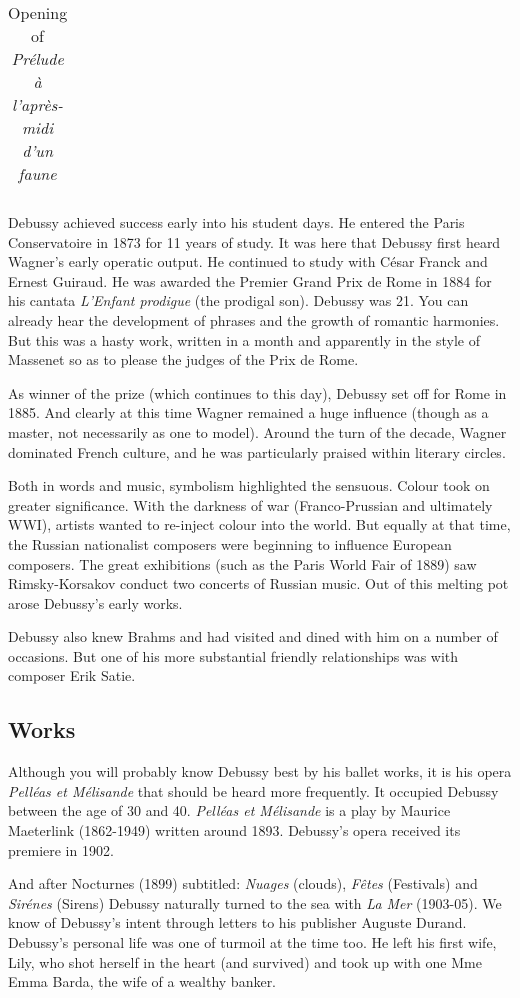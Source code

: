 \begin{table}[h!]
\begin{tabular}{|l|l|}
\hline
\end{tabular}
\caption{Opening of \textit{Pr\'elude \`a l'apr\`es-midi d'un faune}}
\label{tab:faune}
\end{table}

Debussy achieved success early into his student days. He entered the Paris Conservatoire in 1873 for 11 years of study. It was here that Debussy first heard Wagner's early operatic output. He continued to study with C\'esar Franck and Ernest Guiraud. He was awarded the Premier Grand Prix de Rome in 1884 for his cantata \textit{L'Enfant prodigue} (the prodigal son). Debussy was 21. You can already hear the development of phrases and the growth of romantic harmonies. But this was a hasty work, written in a month and apparently in the style of Massenet so as to please the judges of the Prix de Rome. 

As winner of the prize (which continues to this day), Debussy set off for Rome in 1885. And clearly at this time Wagner remained a huge influence (though as a master, not necessarily as one to model). Around the turn of the decade, Wagner dominated French culture, and he was particularly praised within literary circles.

Both in words and music, symbolism highlighted the sensuous. Colour took on greater significance. With the darkness of war (Franco-Prussian and ultimately WWI), artists wanted to re-inject colour into the world. But equally at that time, the Russian nationalist composers were beginning to influence European composers. The great exhibitions (such as the Paris World Fair of 1889) saw Rimsky-Korsakov conduct two concerts of Russian music. Out of this melting pot arose Debussy's early works. 

Debussy also knew Brahms and had visited and dined with him on a number of occasions. But one of his more substantial friendly relationships was with composer Erik Satie.

\subsection{Works}
Although you will probably know Debussy best by his ballet works, it is his opera \textit{Pell\'eas et M\'elisande} that should be heard more frequently. It occupied Debussy between the age of 30 and 40. \textit{Pell\'eas et M\'elisande} is a play by Maurice Maeterlink (1862-1949) written around 1893. Debussy's opera received its premiere in 1902. 

And after Nocturnes (1899) subtitled: \textit{Nuages} (clouds), \textit{F\^etes} (Festivals) and \textit{Sir\'enes} (Sirens) Debussy naturally turned to the sea with \textit{La Mer} (1903-05). We know of Debussy's intent through letters to his publisher Auguste Durand. Debussy's personal life was one of turmoil at the time too. He left his first wife, Lily, who shot herself in the heart (and survived) and took up with one Mme Emma Barda, the wife of a wealthy banker. 

